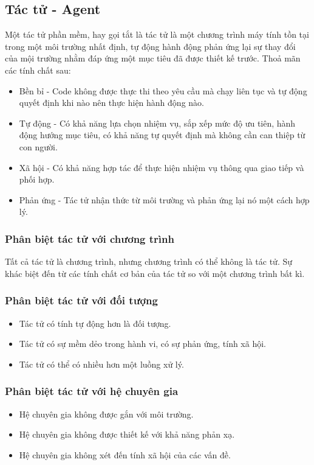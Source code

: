\documentclass[../report.tex]{subfiles}
\begin{document}
\subsection{Tác tử - Agent}
Một tác tử phần mềm, hay gọi tắt là tác tử là một chương trình máy tính tồn tại trong một môi trường nhất định, 
tự động hành động phản ứng lại sự thay đổi của mội trường nhằm đáp ứng một mục tiêu đã được thiết kế trước. 
Thoả mãn các tính chất sau: 
\begin{itemize}
    \item Bền bỉ - Code không được thực thi theo yêu cầu mà chạy liên tục và tự động quyết định 
        khi nào nên thực hiện hành động nào. 
    \item Tự động - Có khả năng lựa chọn nhiệm vụ, sắp xếp mức độ ưu tiên, hành động hướng mục tiêu, 
        có khả năng tự quyết định mà không cần can thiệp từ con người. 
    \item Xã hội - Có khả năng hợp tác để thực hiện nhiệm vụ thông qua giao tiếp và phối hợp. 
    \item Phản ứng - Tác tử nhận thức từ môi trường và phản ứng lại nó một cách hợp lý. 
\end{itemize}

\subsubsection{Phân biệt tác tử với chương trình}
Tất cả tác tử là chương trình, nhưng chương trình có thể không là tác tử. Sự khác biệt đến từ các tính chất cơ bản của tác tử so với 
một chương trình bất kì. 

\subsubsection{Phân biệt tác tử với đối tượng}
\begin{itemize}
    \item Tác tử có tính tự động hơn là đối tượng.
    \item Tác tử có sự mềm dẻo trong hành vi, có sự phản ứng, tính xã hội. 
    \item Tác tử có thể có nhiều hơn một luồng xử lý. 
\end{itemize}

\subsubsection{Phân biệt tác tử với hệ chuyên gia}
\begin{itemize}
    \item Hệ chuyên gia không được gắn với môi trường. 
    \item Hệ chuyên gia không được thiết kế với khả năng phản xạ. 
    \item Hệ chuyên gia không xét đến tính xã hội của các vấn đề.
\end{itemize}
\end{document}

